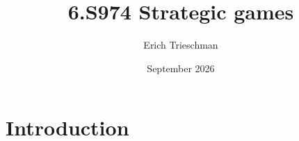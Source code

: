 \documentclass{article}
\title{6.S974 Strategic games}
\author{Erich Trieschman}
\date{September 2026}
\begin{document}
\maketitle

\section{Introduction}
\end{document}
